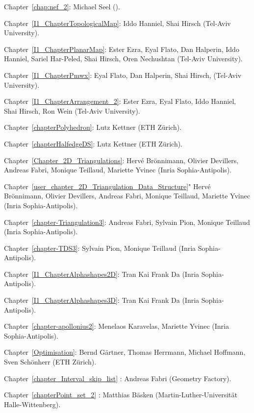\noindent
Chapter~\ref{chap:nef_2}: Michael Seel 
().

\noindent
Chapter~\ref{I1_ChapterTopologicalMap}: Iddo Hanniel, Shai Hirsch 
(Tel-Aviv University).

\noindent
Chapter~\ref{I1_ChapterPlanarMap}: Ester Ezra, Eyal Flato, Dan Halperin, 
Iddo Hanniel, Sariel Har-Peled, Shai Hirsch, Oren Nechushtan 
(Tel-Aviv University).

\noindent
Chapter~\ref{I1_ChapterPmwx}: Eyal Flato, Dan Halperin, Shai Hirsch,
(Tel-Aviv University).

\noindent
Chapter~\ref{I1_ChapterArrangement_2}: Ester Ezra, Eyal Flato, 
Iddo Hanniel, Shai Hirsch, Ron Wein (Tel-Aviv University).


\noindent
Chapter~\ref{chapterPolyhedron}: Lutz Kettner (ETH Z\"urich).

\noindent
Chapter~\ref{chapterHalfedgeDS}: Lutz Kettner (ETH Z\"urich).

\noindent
Chapter~\ref{Chapter_2D_Triangulations}: 
Herv\'e Br\"onnimann, Olivier Devillers, Andreas Fabri,
Monique Teillaud, Mariette Yvinec ({\sc Inria} Sophia-Antipolis).

\noindent
Chapter~\ref{user_chapter_2D_Triangulation_Data_Structure}"
Herv\'e Br\"onnimann, Olivier Devillers, Andreas Fabri,
Monique Teillaud, Mariette Yvinec ({\sc Inria} Sophia-Antipolis).


\noindent
Chapter~\ref{chapter-Triangulation3}: 
Andreas Fabri, Sylvain Pion, Monique Teillaud ({\sc Inria} Sophia-Antipolis).

\noindent
Chapter~\ref{chapter-TDS3}: 
Sylvain Pion, Monique Teillaud ({\sc Inria} Sophia-Antipolis).

\noindent
Chapter~\ref{I1_ChapterAlphashapes2D}: 
Tran Kai Frank Da ({\sc Inria} Sophia-Antipolis).

\noindent
Chapter~\ref{I1_ChapterAlphashapes3D}: 
Tran Kai Frank Da ({\sc Inria} Sophia-Antipolis).

\noindent
Chapter~\ref{chapter-apollonius2}: Menelaos Karavelas, Mariette Yvinec ({\sc Inria} Sophia-Antipolis).



\noindent
Chapter~\ref{Optimisation}: Bernd G\"artner, Thomas Herrmann, Michael Hoffmann,
Sven Sch\"onherr (ETH Z\"urich).

\noindent
Chapter~\ref{chapter_Interval_skip_list} : Andreas Fabri ({\sc Geometry Factory}).

\noindent
Chapter~\ref{chapterPoint_set_2} : Matthias B\"asken (Martin-Luther-Universit{\"a}t Halle-Wittenberg).

